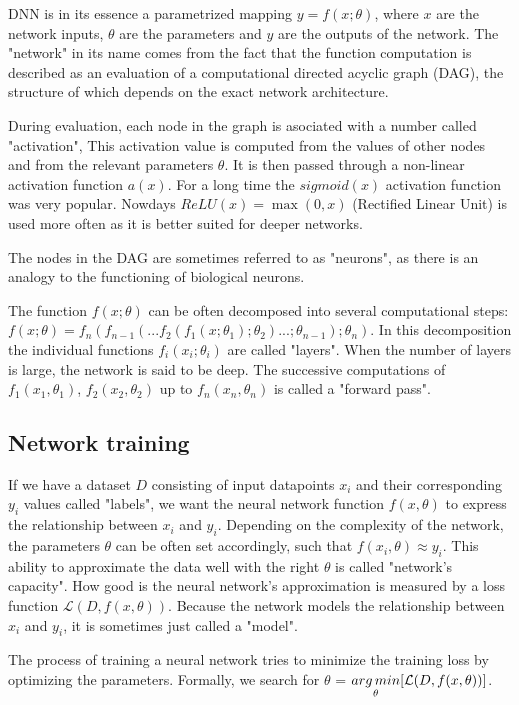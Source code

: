 DNN is in its essence a parametrized mapping $y = f(x;\theta)$, where $x$ are the network inputs, $\theta$ are the parameters and $y$ are the outputs of the network. The "network" in its name comes from the fact that the function computation is described as an evaluation of a computational directed acyclic graph (DAG), the structure of which depends on the exact network architecture.

During evaluation, each node in the graph is asociated with a number called "activation", This activation value is computed from the values of other nodes and from the relevant parameters $\theta$. It is then passed through a non-linear activation function $a(x)$. For a long time the $sigmoid(x)$ activation function was very popular. Nowdays $ReLU(x) = \max(0, x)$ (Rectified Linear Unit) is used more often as it is better suited for deeper networks.

The nodes in the DAG are sometimes referred to as "neurons", as there is an analogy to the functioning of biological neurons.

The function $f(x;\theta)$ can be often decomposed into several computational steps: $f(x;\theta) = f_n(f_{n-1}(...f_2(f_1(x; \theta_1);\theta_2)...;\theta_{n-1});\theta_n)$. In this decomposition the individual functions $f_i(x_i; \theta_i)$ are called "layers". When the number of layers is large, the network is said to be deep. The successive computations of $f_1(x_1, \theta_1)$, $f_2(x_2, \theta_2)$ up to $f_n(x_n, \theta_n)$ is called a "forward pass".

\subsection{Network training}
If we have a dataset $D$ consisting of input datapoints $x_i$ and their corresponding $y_i$ values called "labels", we want the neural network function $f(x, \theta)$ to express the relationship between $x_i$ and $y_i$. Depending on the complexity of the network, the parameters $\theta$ can be often set accordingly, such that $f(x_i, \theta) \approx y_i$. This ability to approximate the data well with the right $\theta$ is called "network's capacity". How good is the neural network's approximation is measured by a loss function $\mathcal{L}(D, f(x, \theta))$. Because the network models the relationship between $x_i$ and $y_i$, it is sometimes just called a "model".

The process of training a neural network tries to minimize the training loss by optimizing the parameters. Formally, we search for $\theta$ = $\underset{\theta}{arg\,min}[ \mathcal{L}(D, f(x, \theta))]$.

